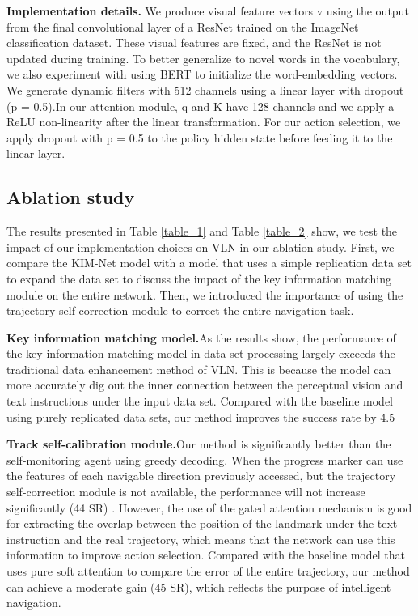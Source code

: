 \textbf{Implementation details.} We produce visual feature vectors v using the output from the final convolutional layer of a ResNet trained on the ImageNet classification dataset. These visual features are fixed, and the ResNet is not updated during training. To better generalize to novel words in the vocabulary, we also experiment with using BERT to initialize the word-embedding vectors. We generate dynamic filters with 512 channels using a linear layer with dropout (p = 0.5).In our attention module, q and K have 128 channels and we apply a ReLU non-linearity after the linear transformation. For our action selection, we apply dropout with p = 0.5 to the policy hidden state before feeding it to the linear layer.

\subsection{Ablation study}
The results presented in Table \ref{table_1} and Table \ref{table_2} show, we test the impact of our implementation choices on VLN in our ablation study. First, we compare the KIM-Net model with a model that uses a simple replication data set to expand the data set to discuss the impact of the key information matching module on the entire network. Then, we introduced the importance of using the trajectory self-correction module to correct the entire navigation task.

\textbf{Key information matching model.}As the results show, the performance of the key information matching model in data set processing largely exceeds the traditional data enhancement method of VLN. This is because the model can more accurately dig out the inner connection between the perceptual vision and text instructions under the input data set. Compared with the baseline model using purely replicated data sets, our method improves the success rate by 4.5 

\textbf{Track self-calibration module.}Our method is significantly better than the self-monitoring agent using greedy decoding. When the progress marker can use the features of each navigable direction previously accessed, but the trajectory self-correction module is not available, the performance will not increase significantly (44 SR) . However, the use of the gated attention mechanism is good for extracting the overlap between the position of the landmark under the text instruction and the real trajectory, which means that the network can use this information to improve action selection. Compared with the baseline model that uses pure soft attention to compare the error of the entire trajectory, our method can achieve a moderate gain (45 SR), which reflects the purpose of intelligent navigation.

